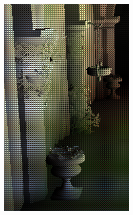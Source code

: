 \begin{figure}[htb]
    \centering
    \begin{subfigure}[b]{0.20\textwidth}
        \centering
        \includegraphics[width=.95\textwidth]{screenshots/interleaved_before}
        \caption{}
        \label{fig:results:interleaved_before}
    \end{subfigure}%
    \begin{subfigure}[b]{0.20\textwidth}
        \centering

\end{subfigure}
\end{figure}
